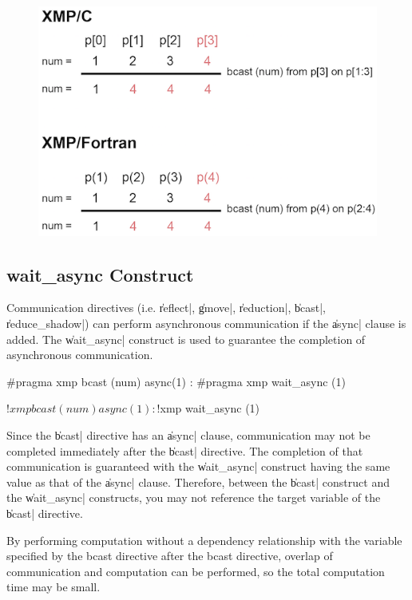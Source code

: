 \begin{figure}
  \centering
  \includegraphics{figs/bcast_from_on.png}
\end{figure}


\subsection{{\bf wait\_async} Construct}

Communication directives (i.e. \|reflect|, \|gmove|, \|reduction|,
\|bcast|, \|reduce_shadow|) can perform asynchronous communication if
the \|async| clause is added. The \|wait_async| construct is used to
guarantee the completion of asynchronous communication.

\begin{XCexample}
#pragma xmp bcast (num) async(1)
    :
#pragma xmp wait_async (1)
\end{XCexample}

\begin{XFexample}
!$xmp bcast (num) async(1)
        :
!$xmp wait_async (1)
\end{XFexample}

Since the \|bcast| directive has an \|async| clause, communication may
not be completed immediately after the \|bcast| directive. The
completion of that communication is guaranteed with the \|wait_async|
construct having the same value as that of the \|async| clause.
%
Therefore, between the \|bcast| construct and the \|wait_async|
constructs, you may not reference the target variable of the \|bcast|
directive.

\begin{myhint}
By performing computation without a dependency
relationship with the variable specified by the bcast directive after
the bcast directive, overlap of communication and computation can be
performed, so the total computation time may be small.
\end{myhint}

